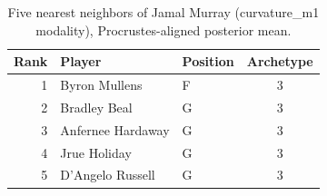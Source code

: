 \begin{table}[htbp]
  \centering\small
  \begin{tabular}{rllc}
    \toprule
    Rank & Player & Position & Archetype \\
    \midrule
    1 & Byron Mullens & F & 3 \\
    2 & Bradley Beal & G & 3 \\
    3 & Anfernee Hardaway & G & 3 \\
    4 & Jrue Holiday & G & 3 \\
    5 & D'Angelo Russell & G & 3 \\
    \bottomrule
  \end{tabular}
  \caption{Five nearest neighbors of Jamal Murray (curvature_m1 modality), Procrustes-aligned posterior mean.}
  \label{tab:Jamal_Murray_neighbors_curvature_m1}
\end{table}

